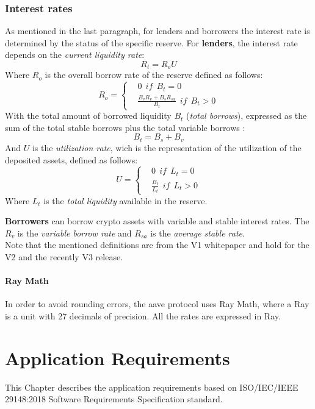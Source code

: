 \documentclass[11pt,a4paper]{report}
\begin{document}
\subsection{Interest rates}
 As mentioned in the last paragraph, for lenders and borrowers the interest rate is determined by the status of the specific reserve. For \textbf{lenders}, the interest rate depends on  the \textit{current liquidity rate}:
\[ R_{t} = R_{o}U \]
Where $ R_{o} $ is the overall borrow rate of the reserve defined as follows:
\begin{equation}
	R_{o} = 
	\left\{\begin{matrix}
		&  0~~if~~B_{t}=0\\ 
		& \frac{B_{v}R_{v}+ B_{s}R_{sa}}{B_{t}}~~if~~B_{t} > 0
	\end{matrix}\right.
\end{equation}
With the total amount of borrowed liquidity $B_{t} $ (\textit{total borrows}), expressed as the sum of the total stable borrows plus  the total variable borrows :
\[ B_{t} = B_{s}+B_{v} \]
And $ U $ is the \textit{utilization rate}, wich is the representation of the utilization of the deposited assets, defined as follows:
\begin{equation}
	U = 
	\left\{\begin{matrix}
		&  0~~if~~L_{t}=0\\ 
		& \frac{B_{t}}{L_{t}}~~if~~L_{t} > 0
	\end{matrix}\right.
\end{equation}
Where $L_{t}$  is the \textit{total liquidity} available in the reserve.

\textbf{Borrowers} can borrow crypto assets with variable and stable interest rates. 
The $R_{v}$\cite{aaveV1RV} is the \textit{variable borrow rate} and $R_{sa}$\cite{aaveV1RS} is the \textit{average stable rate}. \\

Note that the mentioned definitions are from the V1\cite{aaveV1} whitepaper and hold for the V2\cite{aaveV2} and the recently V3\cite{aaveV3} release.
\subsubsection{Ray Math}
In order to avoid rounding errors, the aave protocol uses Ray Math\cite{ray}\cite{ray2}, where a Ray is a unit with 27 decimals of precision. All the rates are expressed in Ray. 


\chapter{Application Requirements} \label{ch:appreq}
This Chapter describes the application requirements based on ISO/IEC/IEEE 29148:2018\cite{iso} Software Requirements Specification standard.
\end{document}
